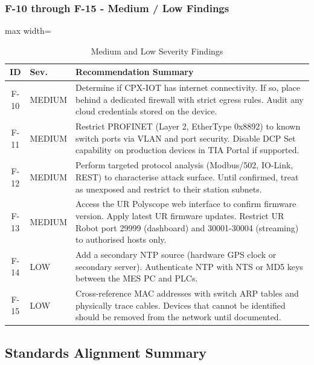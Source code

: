 \subsubsection{F-10 through F-15 - Medium / Low Findings}

\begin{table}[H]
\centering
\caption{Medium and Low Severity Findings}
\begin{adjustbox}{max width=\textwidth}
\begin{tabular}{@{}clp{}@{}}
\toprule
\textbf{ID} & \textbf{Sev.} & \textbf{Recommendation Summary} \\
\midrule
F-10 & MEDIUM & Determine if CPX-IOT has internet connectivity. If so, place behind a dedicated firewall with strict egress rules. Audit any cloud credentials stored on the device. \\
F-11 & MEDIUM & Restrict PROFINET (Layer 2, EtherType 0x8892) to known switch ports via VLAN and port security. Disable DCP Set capability on production devices in TIA Portal if supported. \\
F-12 & MEDIUM & Perform targeted protocol analysis (Modbus/502, IO-Link, REST) to characterise attack surface. Until confirmed, treat as unexposed and restrict to their station subnets. \\
F-13 & MEDIUM & Access the UR Polyscope web interface to confirm firmware version. Apply latest UR firmware updates. Restrict UR Robot port 29999 (dashboard) and 30001-30004 (streaming) to authorised hosts only. \\
F-14 & LOW & Add a secondary NTP source (hardware GPS clock or secondary server). Authenticate NTP with NTS or MD5 keys between the MES PC and PLCs. \\
F-15 & LOW & Cross-reference MAC addresses with switch ARP tables and physically trace cables. Devices that cannot be identified should be removed from the network until documented. \\
\bottomrule
\end{tabular}
\end{adjustbox}

\end{table}

\subsection{Standards Alignment Summary}

